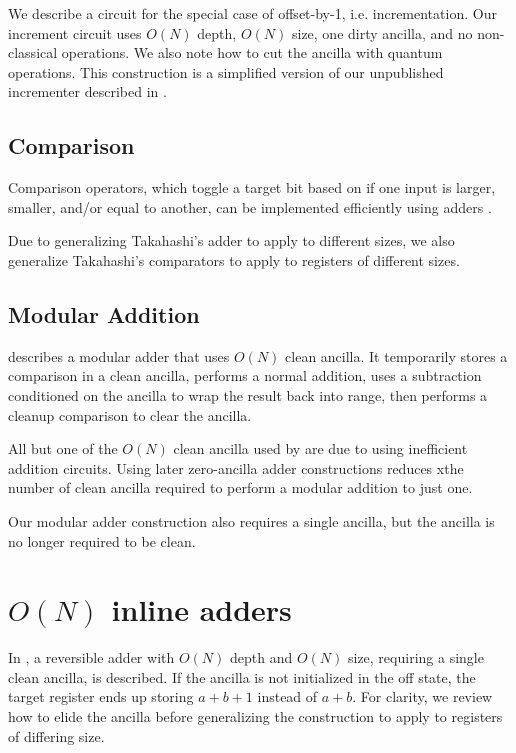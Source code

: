 \documentclass[twocolumn]{article}
\begin{document}
We describe a circuit for the special case of offset-by-1, i.e. incrementation.
Our increment circuit uses $O(N)$ depth, $O(N)$ size, one dirty ancilla, and no non-classical operations.
We also note how to cut the ancilla with quantum operations.
This construction is a simplified version of our unpublished incrementer described in \cite{gidney2015}.

\subsection{Comparison}

Comparison operators, which toggle a target bit based on if one input is larger, smaller, and/or equal to another, can be implemented efficiently using adders \cite{takahashi2005}.

Due to generalizing Takahashi's adder \cite{takahashi2005} to apply to different sizes, we also generalize Takahashi's comparators to apply to registers of different sizes.

\subsection{Modular Addition}

\cite{vedral1995} describes a modular adder that uses $O(N)$ clean ancilla.
It temporarily stores a comparison in a clean ancilla, performs a normal addition, uses a subtraction conditioned on the ancilla to wrap the result back into range, then performs a cleanup comparison to clear the ancilla.

All but one of the $O(N)$ clean ancilla used by \cite{vedral1995} are due to using inefficient addition circuits.
Using later zero-ancilla adder constructions reduces xthe number of clean ancilla required to perform a modular addition to just one.

Our modular adder construction also requires a single ancilla, but the ancilla is no longer required to be clean.

\section{$O(N)$ inline adders} \label{sec:first-circuit}

In \cite{van2004}, a reversible adder with $O(N)$ depth and $O(N)$ size, requiring a single clean ancilla, is described.
If the ancilla is not initialized in the off state, the target register ends up storing $a+b+1$ instead of $a+b$.
For clarity, we review how to elide the ancilla before generalizing the construction to apply to registers of differing size.
\end{document}
